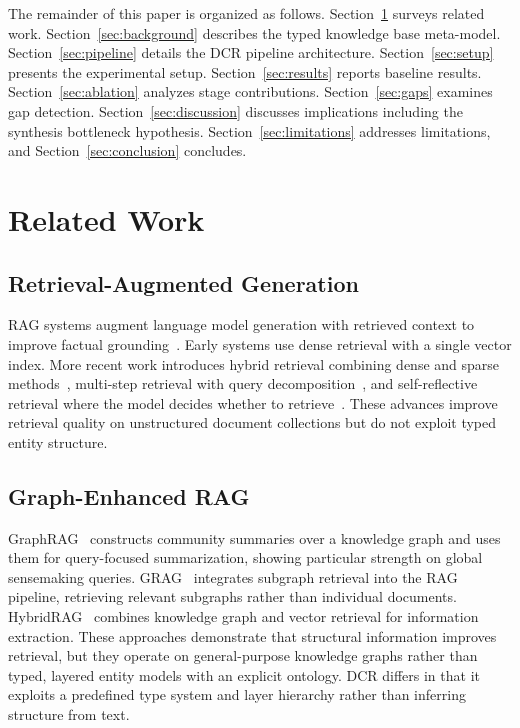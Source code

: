 \documentclass[11pt,a4paper]{article}
\begin{document}
The remainder of this paper is organized as follows. Section~\ref{sec:related} surveys related work. Section~\ref{sec:background} describes the typed knowledge base meta-model. Section~\ref{sec:pipeline} details the DCR pipeline architecture. Section~\ref{sec:setup} presents the experimental setup. Section~\ref{sec:results} reports baseline results. Section~\ref{sec:ablation} analyzes stage contributions. Section~\ref{sec:gaps} examines gap detection. Section~\ref{sec:discussion} discusses implications including the synthesis bottleneck hypothesis. Section~\ref{sec:limitations} addresses limitations, and Section~\ref{sec:conclusion} concludes.

\section{Related Work}
\label{sec:related}

\subsection{Retrieval-Augmented Generation}

RAG systems augment language model generation with retrieved context to improve factual grounding~\citep{lewis2020rag}. Early systems use dense retrieval with a single vector index. More recent work introduces hybrid retrieval combining dense and sparse methods~\citep{chen2024bge}, multi-step retrieval with query decomposition~\citep{press2023selfask}, and self-reflective retrieval where the model decides whether to retrieve~\citep{asai2024selfrag}. These advances improve retrieval quality on unstructured document collections but do not exploit typed entity structure.

\subsection{Graph-Enhanced RAG}

GraphRAG~\citep{edge2024graphrag} constructs community summaries over a knowledge graph and uses them for query-focused summarization, showing particular strength on global sensemaking queries. GRAG~\citep{hu2024grag} integrates subgraph retrieval into the RAG pipeline, retrieving relevant subgraphs rather than individual documents. HybridRAG~\citep{sarmah2024hybridrag} combines knowledge graph and vector retrieval for information extraction. These approaches demonstrate that structural information improves retrieval, but they operate on general-purpose knowledge graphs rather than typed, layered entity models with an explicit ontology. DCR differs in that it exploits a predefined type system and layer hierarchy rather than inferring structure from text.
\end{document}

